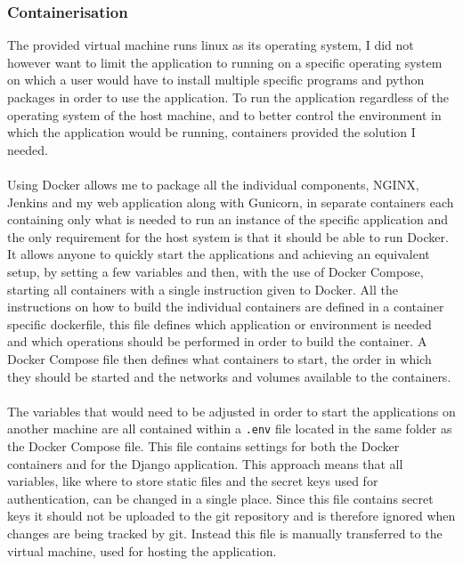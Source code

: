 \subsubsection{Containerisation}\label{sec:cont}
The provided virtual machine runs linux as its operating system, I did not however want to limit the application to running on a specific operating system on which a user would have to install multiple specific programs and python packages in order to use the application. To run the application regardless of the operating system of the host machine, and to better control the environment in which the application would be running, containers provided the solution I needed.\\\\
Using Docker allows me to package all the individual components, NGINX, Jenkins and my web application along with Gunicorn, in separate containers each containing only what is needed to run an instance of the specific application and the only requirement for the host system is that it should be able to run Docker. It allows anyone to quickly start the applications and achieving an equivalent setup, by setting a few variables and then, with the use of Docker Compose, starting all containers with a single instruction given to Docker. All the instructions on how to build the individual containers are defined in a container specific dockerfile, this file defines which application or environment is needed and which operations should be performed in order to build the container. A Docker Compose file then defines what containers to start, the order in which they should be started and the networks and volumes available to the containers.\\\\
The variables that would need to be adjusted in order to start the applications on another machine are all contained within a \verb|.env| file located in the same folder as the Docker Compose file. This file contains settings for both the Docker containers and for the Django application. This approach means that all variables, like where to store static files and the secret keys used for authentication, can be changed in a single place. Since this file contains secret keys it should not be uploaded to the git repository and is therefore ignored when changes are being tracked by git. Instead this file is manually transferred to the virtual machine, used for hosting the application.